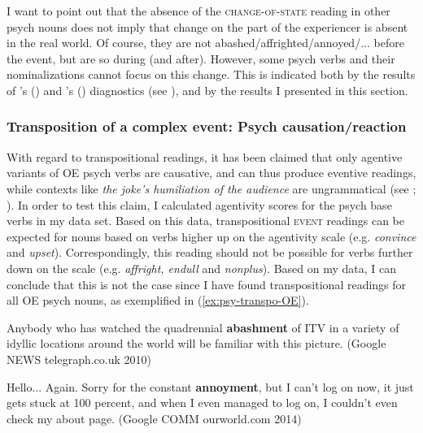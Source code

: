 I want to point out that the absence of the \textsc{change-of-state} reading in other psych nouns does not imply that change on the part of the experiencer is absent in the real world. Of course, they are not abashed/affrighted/annoyed/... before the event, but are so during (and after). However, some psych verbs and their nominalizations cannot focus on this change. This is indicated both by the results of \citeauthor{VanValin.2005}'s (\citeyear{VanValin.2005}) and \citeauthor{Alexiadou.2014}'s (\citeyear{Alexiadou.2014}) diagnostics (see ), and by the results I presented in this section. 

\subsubsection[Transposition of a complex event]{Transposition of a complex event: Psych causation/reaction}
\label{sec:psy-output-survey-transOE}

With regard to transpositional readings, it has been claimed that only agentive variants of OE psych verbs are causative, and can thus produce eventive readings, while contexts like \textit{the joke's humiliation of the audience} are ungrammatical (see ; \citealt{Grimshaw.1990}). In order to test this claim, I calculated agentivity scores for the psych base verbs in my data set. Based on this data, transpositional \textsc{event} readings can be expected for nouns based on verbs higher up on the agentivity scale (e.g. \textit{convince} and \textit{upset}). Correspondingly, this reading should not be possible for verbs further down on the scale (e.g. \textit{affright, endull} and \textit{nonplus}). Based on my data, I can conclude that this is not the case since I have found transpositional readings for all OE psych nouns, as exemplified in (\ref{ex:psy-transpo-OE}).

\begin{exe}
	\ex \label{ex:psy-transpo-OE}
	\begin{xlist}
	\item \label{ex:psy-transpo-OE1} Anybody who has watched the quadrennial \textbf{abashment} of ITV in a variety of idyllic locations around the world will be familiar with this picture. {\small(Google NEWS telegraph.co.uk 2010)}
	\item \label{ex:psy-transpo-OE2} Hello... Again. Sorry for the constant \textbf{annoyment}, but I can't log on now, it just gets stuck at 100 percent, and when I even managed to log on, I couldn't even check my about page. {\small(Google COMM ourworld.com 2014)}
	\end{xlist}
\end{exe}

